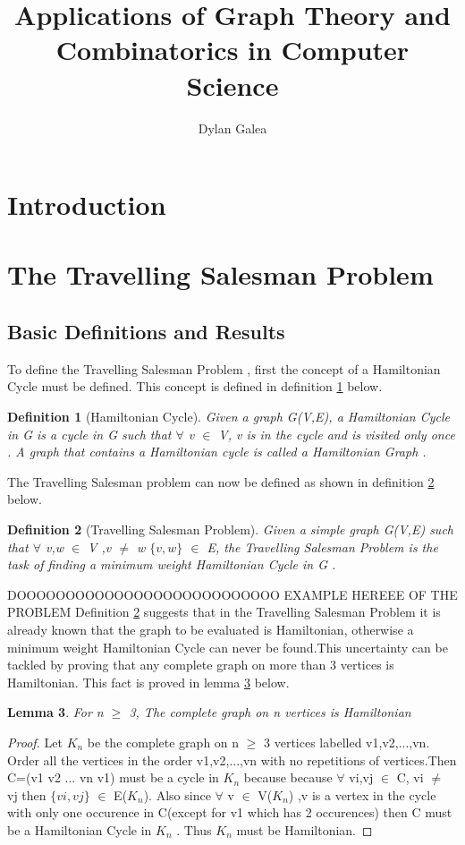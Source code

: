 \documentclass{article}
\title{Applications of Graph Theory and Combinatorics in Computer Science}
\author{Dylan Galea}
\newtheorem{definition}{Definition}[subsection]
\newtheorem{lemma}[definition]{Lemma}
\begin{document}
\maketitle
\newpage
\tableofcontents
\newpage
\section{Introduction}
\newpage
\section{The Travelling Salesman Problem}
\subsection{Basic Definitions and Results}
To define the Travelling Salesman Problem , first the concept of a Hamiltonian Cycle must be defined. This concept is defined in definition \ref{Hamiltonian Cycle} below.
\begin{definition}[Hamiltonian Cycle]
\label{Hamiltonian Cycle}
Given a graph G(V,E), a Hamiltonian Cycle in G is a cycle in G such that $\forall$ v $\in$ V, v is in the cycle and is visited only once . A graph that contains a Hamiltonian cycle is called a Hamiltonian Graph \cite{weisstein_2018}.
\end{definition}
The Travelling Salesman problem can now be defined as shown in definition \ref{Travelling Salesman Problem} below.
\begin{definition}[Travelling Salesman Problem]
\label{Travelling Salesman Problem}
Given a simple graph G(V,E) such that $\forall$ v,w $\in$ V ,v $\ne$ w $\{v,w\}$ $\in$ E, the Travelling Salesman Problem is the task of finding a minimum weight Hamiltonian Cycle in G \cite{geeksforgeeks_2018}.
\end{definition}
DOOOOOOOOOOOOOOOOOOOOOOOOOOO EXAMPLE HEREEE OF THE PROBLEM 
Definition \ref{Travelling Salesman Problem} suggests that in the Travelling Salesman Problem it is already known that the graph to be evaluated is Hamiltonian, otherwise a minimum weight Hamiltonian Cycle can never be found.This uncertainty can be tackled by proving
that any complete graph on more than 3 vertices is Hamiltonian. This fact is proved in lemma \ref{Kn is Hamiltonian} below.
\begin{lemma}
\label{Kn is Hamiltonian}
For n $\geq$ 3, The complete graph on n vertices is Hamiltonian
\end{lemma}
\begin{proof}
Let $K_n$ be the complete graph on n $\geq$ 3 vertices labelled v1,v2,...,vn. Order all the vertices in the order v1,v2,...,vn with no repetitions of vertices.Then C=(v1 v2 ... vn v1) must be a cycle in $K_n$ because because $\forall$ vi,vj $\in$ C, vi $\ne$ vj then $\{vi,vj\}$ $\in$ E($K_n$). Also since $\forall$ v $\in$ V($K_n$) ,v is a vertex in the cycle with only one occurence in C(except for v1 which has 2 occurences) then C must be a Hamiltonian Cycle in $K_n$ . Thus $K_n$ must be Hamiltonian.
\end{proof}
\end{document}
